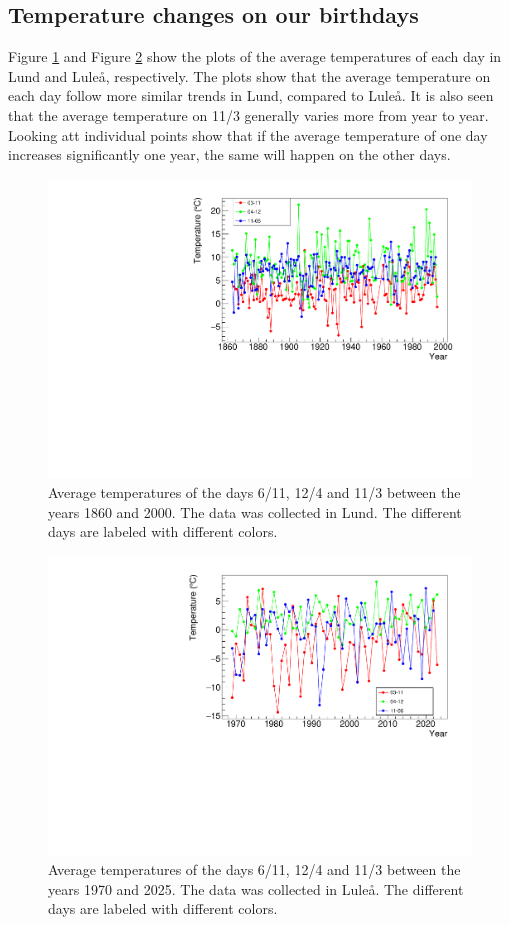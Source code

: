 \subsection{Temperature changes on our birthdays}

Figure \ref{fig:lund} and Figure \ref{fig:luleå} show the plots of the average temperatures of each day in Lund and Luleå, respectively. The plots show that the average temperature on each day follow more similar trends in Lund, compared to Luleå. It is also seen that the average temperature on 11/3 generally varies more from year to year. Looking att individual points show that if the average temperature of one day increases significantly one year, the same will happen on the other days.

\begin{figure}[H]
    \centering
    \includegraphics[width=0.85\linewidth]{../plots/bdays/Lundbdays.pdf}
    \caption{Average temperatures of the days 6/11, 12/4 and 11/3 between the years 1860 and 2000. The data was collected in Lund. The different days are labeled with different colors.}
    \label{fig:lund}
\end{figure}


\begin{figure}[H]
    \centering
    \includegraphics[width=0.85\linewidth]{../plots/bdays/Luleabdays.pdf}
    \caption{Average temperatures of the days 6/11, 12/4 and 11/3 between the years 1970 and 2025. The data was collected in Luleå. The different days are labeled with different colors.}
    \label{fig:luleå}
\end{figure}


